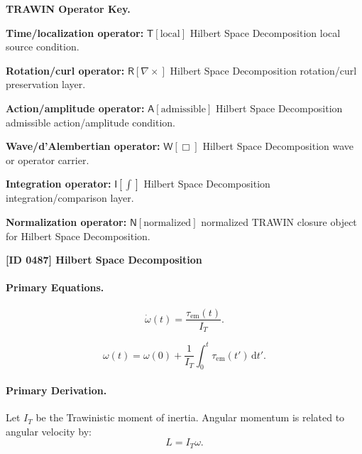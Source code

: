 \par\vspace{0.45\baselineskip}
\noindent\begin{minipage}[t]{\linewidth}
\begingroup
\small
\raggedright
\textbf{TRAWIN Operator Key.}\par
\noindent\textbf{Time/localization operator:} $\mathsf{T}\!\left[\mathrm{local}\right]$ Hilbert Space Decomposition local source condition.\par
\noindent\textbf{Rotation/curl operator:} $\mathsf{R}\!\left[\nabla\times\right]$ Hilbert Space Decomposition rotation/curl preservation layer.\par
\noindent\textbf{Action/amplitude operator:} $\mathsf{A}\!\left[\mathrm{admissible}\right]$ Hilbert Space Decomposition admissible action/amplitude condition.\par
\noindent\textbf{Wave/d'Alembertian operator:} $\mathsf{W}\!\left[\Box\right]$ Hilbert Space Decomposition wave or operator carrier.\par
\noindent\textbf{Integration operator:} $\mathsf{I}\!\left[\int\right]$ Hilbert Space Decomposition integration/comparison layer.\par
\noindent\textbf{Normalization operator:} $\mathsf{N}\!\left[\mathrm{normalized}\right]$ normalized TRAWIN closure object for Hilbert Space Decomposition.\par
\endgroup
\end{minipage}

\clearpage
\noindent\textbf{[ID 0487] Hilbert Space Decomposition}\par
\vspace{0.35em}
\paragraph{Primary Equations.}
\begin{equation}
\dot{\omega}(t)
=
\frac{\tau_{\mathrm{em}}(t)}{I_T}.
\end{equation}

\begin{equation}
\omega(t)
=
\omega(0)
+
\frac{1}{I_T}
\int_0^t
\tau_{\mathrm{em}}(t')
\,\mathrm{d}t' .
\end{equation}

\paragraph{Primary Derivation.}
Let $I_T$ be the Trawinistic moment of inertia.  
Angular momentum is related to angular velocity by:
\begin{equation}
L=I_T\omega .
\end{equation}

